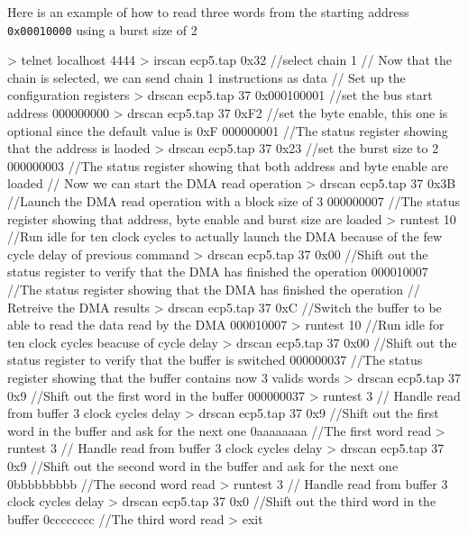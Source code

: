 \documentclass[a4paper,11pt,oneside]{report}
\begin{document}
Here is an example of how to read three words from the starting address \texttt{0x00010000} using a burst size of 2
\begin{listing}

    > telnet localhost 4444
    > irscan ecp5.tap 0x32              //select chain 1
    // Now that the chain is selected, we can send chain 1 instructions as data
    // Set up the configuration registers
    > drscan ecp5.tap 37 0x000100001    //set the bus start address
    000000000
    > drscan ecp5.tap 37 0xF2           //set the byte enable, this one is optional since the default value is 0xF
    000000001                           //The status register showing that the address is laoded
    > drscan ecp5.tap 37 0x23           //set the burst size to 2
    000000003                           //The status register showing that both address and byte enable are loaded 
    // Now we can start the DMA read operation
    > drscan ecp5.tap 37 0x3B           //Launch the DMA read operation with a block size of 3
    000000007                           //The status register showing that address, byte enable and burst size are loaded             
    > runtest 10                        //Run idle for ten clock cycles to actually launch the DMA because of the few cycle delay of previous command
    > drscan ecp5.tap 37 0x00           //Shift out the status register to verify that the DMA has finished the operation
    000010007                           //The status register showing that the DMA has finished the operation
    // Retreive the DMA results
    > drscan ecp5.tap 37 0xC            //Switch the buffer to be able to read the data read by the DMA
    000010007
    > runtest 10                        //Run idle for ten clock cycles beacuse of cycle delay
    > drscan ecp5.tap 37 0x00           //Shift out the status register to verify that the buffer is switched
    000000037                           //The status register showing that the buffer contains now 3 valids words
    > drscan ecp5.tap 37 0x9            //Shift out the first word in the buffer
    000000037
    > runtest 3                         // Handle read from buffer 3 clock cycles delay
    > drscan ecp5.tap 37 0x9            //Shift out the first word in the buffer and ask for the next one
    0aaaaaaaa                           //The first word read
    > runtest 3                         // Handle read from buffer 3 clock cycles delay
    > drscan ecp5.tap 37 0x9            //Shift out the second word in the buffer and ask for the next one
    0bbbbbbbbb                          //The second word read
    > runtest 3                         // Handle read from buffer 3 clock cycles delay
    > drscan ecp5.tap 37 0x0            //Shift out the third word in the buffer
    0cccccccc                           //The third word read
    > exit

\end{listing}
\end{document}
